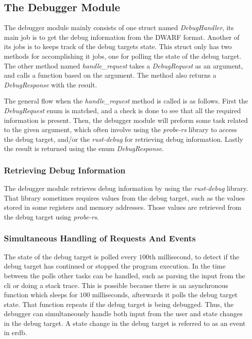 \subsection{The Debugger Module}
The debugger module mainly consists of one struct named \emph{DebugHandler}, its main job is to get the debug information from the \gls{DWARF} format.
Another of its jobs is to keeps track of the debug targets state.
This struct only has two methods for accomplishing it jobs, one for polling the state of the debug target.
The other method named \emph{handle\_request} takes a \emph{DebugRequest} as an argument, and calls a function based on the argument.
The method also returns a \emph{DebugResponse} with the result.


The general flow when the \emph{handle\_request} method is called is as follows.
First the \emph{DebugRequest} enum is matched, and a check is done to see that all the required information is present.
Then, the debugger module will preform some task related to the given argument, which often involve using the \emph{probe-rs} library to access the debug target, and/or the \emph{rust-debug} for retrieving debug information.
Lastly the result is returned using the enum \emph{DebugResponse}.



\subsubsection{Retrieving Debug Information}
The debugger module retrieves debug information by using the \emph{rust-debug} library.
That library sometimes requires values from the debug target, such as the values stored in some registers and memory addresses.
Those values are retrieved from the debug target using \emph{probe-rs}.



\subsubsection{Simultaneous Handling of Requests And Events}
The state of the debug target is polled every $100\text{th}$ millisecond, to detect if the debug target has continued or stopped the program execution.
In the time between the polls other tasks can be handled, such as parsing the input from the \acrshort{cli} or doing a stack trace.
This is possible because there is an asynchronous function which sleeps for $100$ milliseconds, afterwards it polls the debug target state.
That function repeats if the debug target is being debugged.
Thus, the debugger can simultaneously handle both input from the user and state changes in the debug target.
A state change in the debug target is referred to as an event in \gls{erdb}.




